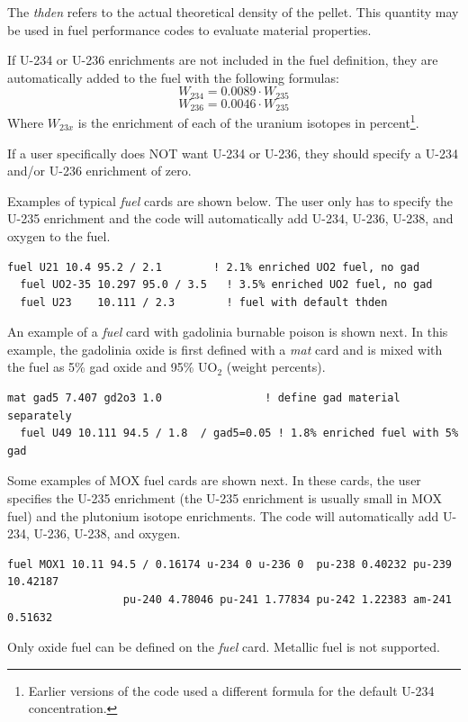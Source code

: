 The {\it thden} refers to the actual theoretical density of the pellet.  This quantity may be
used in fuel performance codes to evaluate material properties.

If U-234 or U-236 enrichments are not included in the fuel definition, they are automatically
added to the fuel with the following formulas:
\begin{equation}
   W_{234} = 0.0089 \cdot W_{235}
\end{equation}
\begin{equation}
  W_{236} = 0.0046 \cdot W_{235}
\end{equation}
Where $W_{23x}$ is the enrichment of each of the uranium isotopes
in percent\footnote{Earlier versions of the code used a different formula for the default U-234 concentration.}.

If a user specifically does NOT want U-234 or U-236, they should specify a U-234
and/or U-236 enrichment of zero.

Examples of typical {\it fuel} cards are shown below.  The user
only has to specify the U-235 enrichment and the code will automatically add
U-234, U-236, U-238, and oxygen to the fuel.
\begin{Verbatim}[fontsize=\small]
  fuel U21 10.4 95.2 / 2.1        ! 2.1% enriched UO2 fuel, no gad
  fuel UO2-35 10.297 95.0 / 3.5   ! 3.5% enriched UO2 fuel, no gad
  fuel U23    10.111 / 2.3        ! fuel with default thden
\end{Verbatim}

An example of a {\it fuel} card with gadolinia burnable poison is shown next.
In this example, the gadolinia oxide is first defined with a {\it mat} card and
is mixed with the fuel as 5\%  gad oxide and 95\% UO$_2$ (weight percents).
\begin{Verbatim}[fontsize=\small]
  mat gad5 7.407 gd2o3 1.0                ! define gad material separately
  fuel U49 10.111 94.5 / 1.8  / gad5=0.05 ! 1.8% enriched fuel with 5% gad
\end{Verbatim}

Some examples of MOX fuel cards are shown next.  In these cards, the user specifies
the U-235 enrichment (the U-235 enrichment is usually small in MOX fuel) and the
plutonium isotope enrichments.  The code will automatically add U-234, U-236, U-238,
and oxygen.
\begin{Verbatim}[fontsize=\small]
  fuel MOX1 10.11 94.5 / 0.16174 u-234 0 u-236 0  pu-238 0.40232 pu-239 10.42187
                  pu-240 4.78046 pu-241 1.77834 pu-242 1.22383 am-241 0.51632
\end{Verbatim}

Only oxide fuel can be defined on the {\it fuel} card. Metallic fuel is not supported.

